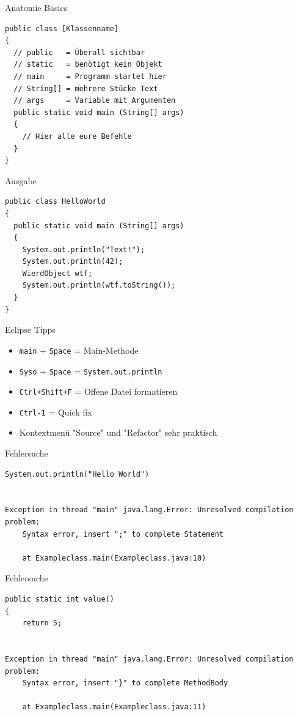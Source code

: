 \documentclass{beamer}
\begin{document}
\begin{frame}[fragile]{Anatomie Basics}
\begin{lstlisting}
public class [Klassenname] 
{ 
  // public   = Überall sichtbar
  // static   = benötigt kein Objekt
  // main     = Programm startet hier 
  // String[] = mehrere Stücke Text
  // args     = Variable mit Argumenten
  public static void main (String[] args) 
  {
    // Hier alle eure Befehle
  }
}
\end{lstlisting}
\end{frame}

\begin{frame}[fragile]{Ausgabe}
\begin{lstlisting}
public class HelloWorld 
{ 
  public static void main (String[] args)
  {
    System.out.println("Text!");
    System.out.println(42);
    WierdObject wtf;
    System.out.println(wtf.toString());
  }
}
\end{lstlisting}
\end{frame}

\begin{frame}[fragile]{Eclipse Tipps}
\begin{itemize}
\item \texttt{main} + \texttt{Space} = Main-Methode
\item \texttt{Syso} + \texttt{Space} = \texttt{System.out.println}
\item \texttt{Ctrl+Shift+F} = Offene Datei formatieren
\item \texttt{Ctrl-1} = Quick fix
\item Kontextmenü "Source" und "Refactor" sehr praktisch
\end{itemize}
\end{frame}

\begin{frame}[fragile]{Fehlersuche}
  \begin{lstlisting}
System.out.println("Hello World")


Exception in thread "main" java.lang.Error: Unresolved compilation problem: 
    Syntax error, insert ";" to complete Statement

    at Exampleclass.main(Exampleclass.java:10)
  \end{lstlisting}
\end{frame}

\begin{frame}[fragile]{Fehlersuche}
  \begin{lstlisting}
public static int value()
{
    return 5;
	
    
Exception in thread "main" java.lang.Error: Unresolved compilation problem: 
    Syntax error, insert "}" to complete MethodBody

    at Exampleclass.main(Exampleclass.java:11)
  \end{lstlisting}
\end{frame}
\end{document}
